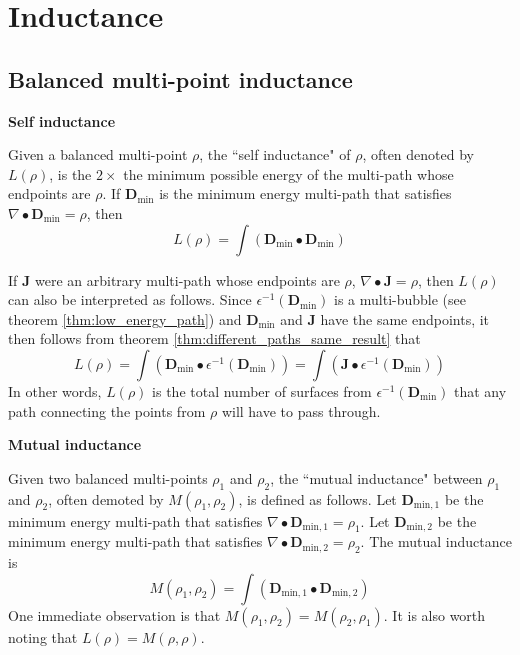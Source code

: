 \section{Inductance}

\subsection{Balanced multi-point inductance}

\textbf{Self inductance}

Given a balanced multi-point \(\rho\), the ``self inductance" of \(\rho\), often denoted by \(L(\rho)\), is the \(2 \times\) the minimum possible energy of the multi-path whose endpoints are \(\rho\). If \(\mathbf{D}_{\text{min}}\) is the minimum energy multi-path that satisfies \(\nabla \bullet \mathbf{D}_{\text{min}} = \rho\), then 
\[L(\rho) = \int (\mathbf{D}_{\text{min}} \bullet \mathbf{D}_{\text{min}})\]  

If \(\mathbf{J}\) were an arbitrary multi-path whose endpoints are \(\rho\), \(\nabla \bullet \mathbf{J} = \rho\), then \(L(\rho)\) can also be interpreted as follows. Since \(\epsilon^{-1}(\mathbf{D}_{\text{min}})\) is a multi-bubble (see theorem \ref{thm:low_energy_path}) and \(\mathbf{D}_{\text{min}}\) and \(\mathbf{J}\) have the same endpoints, it then follows from theorem \ref{thm:different_paths_same_result} that 
\[L(\rho) = \int (\mathbf{D}_{\text{min}} \bullet \epsilon^{-1}(\mathbf{D}_{\text{min}})) = \int (\mathbf{J} \bullet \epsilon^{-1}(\mathbf{D}_{\text{min}}))\]
In other words, \(L(\rho)\) is the total number of surfaces from \(\epsilon^{-1}(\mathbf{D}_{\text{min}})\) that any path connecting the points from \(\rho\) will have to pass through.

\vspace{5mm}

\textbf{Mutual inductance}

Given two balanced multi-points \(\rho_1\) and \(\rho_2\), the ``mutual inductance" between \(\rho_1\) and \(\rho_2\), often demoted by \(M(\rho_1, \rho_2)\), is defined as follows. 
Let \(\mathbf{D}_{\text{min},1}\) be the minimum energy multi-path that satisfies \(\nabla \bullet \mathbf{D}_{\text{min},1} = \rho_1\).
Let \(\mathbf{D}_{\text{min},2}\) be the minimum energy multi-path that satisfies \(\nabla \bullet \mathbf{D}_{\text{min},2} = \rho_2\). 
The mutual inductance is 
\[M(\rho_1, \rho_2) = \int (\mathbf{D}_{\text{min},1} \bullet \mathbf{D}_{\text{min},2})\]
One immediate observation is that \(M(\rho_1, \rho_2) = M(\rho_2, \rho_1)\). It is also worth noting that \(L(\rho) = M(\rho,\rho)\).


